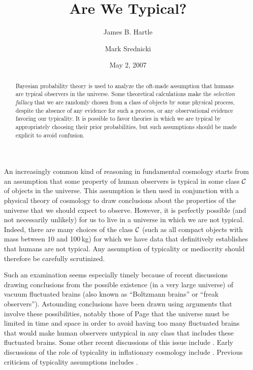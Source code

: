 \documentclass[pra,floatfix,preprint,nofootinbib,12pt]{revtex4}
\begin{document}
\title{Are We Typical?}

\author{James B. Hartle}

\author{Mark Srednicki}


\date{May 2, 2007}

\begin{abstract}

Bayesian probability theory is used to analyze the oft-made assumption that humans are typical observers in the universe.  Some theoretical calculations make the {\it selection fallacy\/} that we are randomly chosen from a class of objects by some physical process, despite the absence of any evidence for such a process, or any observational evidence favoring our typicality.  It is possible to favor theories in which we are typical by appropriately choosing their  prior probabilities, but such assumptions should be made explicit to avoid confusion. 

\end{abstract}


\maketitle

An increasingly common kind of reasoning in fundamental cosmology starts from an assumption
that some property of human observers is typical in some class $\cal C$ of objects in the universe. 
This assumption is then used in conjunction with a physical theory of cosmology to draw conclusions about the properties of the universe that we should expect to observe. However,  it is perfectly possible 
(and not necessarily unlikely) for us to live in a universe in which we are not typical.  
Indeed, there are many choices of the class $\cal C$ (such as all compact objects with mass between 10 and 100$\,$kg) for which we have data that definitively establishes that humans are not typical.  Any assumption of typicality or mediocrity should therefore be carefully scrutinized. 

Such an examination seems especially timely because of recent discussions drawing conclusions from the possible existence (in a very large universe) of vacuum fluctuated brains (also known as ``Boltzmann brains'' or ``freak observers''). Astounding conclusions have been drawn using arguments that involve these possibilities, notably those of Page \cite{Page06a,Page06b,Page06c,Page06d} that the universe must be limited in time and space 
in order to avoid having too many fluctuated brains that would make 
human observers untypical in any class that includes these fluctuated brains.  
Some other recent discussions of this issue include \cite{DKS02,BF06,Linde06,Vil06,Banks07}.  
Early discussions of the role of typicality in inflationary cosmology include \cite{BLL94,Vil95}.
Previous criticism of typicality assumptions includes \cite{Smo04,Neal06}.
\end{document}
